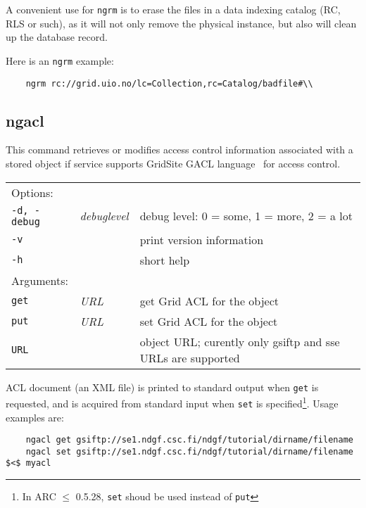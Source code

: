 \begin{framed}
   A convenient use for \texttt{ngrm} is to erase the files in a data
   indexing catalog (RC, RLS or such), as it will not only remove the
   physical instance, but also will clean up the database record.
\end{framed}

Here is an \texttt{ngrm} example:

\begin{verbatim}
    ngrm rc://grid.uio.no/lc=Collection,rc=Catalog/badfile#\\
\end{verbatim}

\subsection{ngacl}\label{sec:ngacl}

This command retrieves or modifies
access control information associated with a stored object if service
supports GridSite GACL language~\cite{gacl} for access control.
\hspace*{0.5cm}
\begin{shaded}
\end{shaded}
\begin{longtable}{llp{8cm}}
   Options:&&\\
    \texttt{-d, -debug} & \textit{debuglevel} &debug level: 0 = some, 1 = more, 2 = a lot \\
    \texttt{-v} && print version information\\
    \texttt{-h} && short help\\
   Arguments:&&\\
    \texttt{get} &\textit{URL}& get Grid ACL for the object\\
    \texttt{put} &\textit{URL}& set Grid ACL for the object\\
    \texttt{URL} && object URL; curently only gsiftp and sse URLs are supported\\
\end{longtable}

ACL document (an XML file) is printed to standard output when
\texttt{get} is requested, and is acquired from standard input when
\texttt{set} is specified\footnote{In ARC $\leq$ 0.5.28, \texttt{set}
  shoud be used instead of \texttt{put}}. Usage examples are:
\begin{verbatim}
    ngacl get gsiftp://se1.ndgf.csc.fi/ndgf/tutorial/dirname/filename
    ngacl set gsiftp://se1.ndgf.csc.fi/ndgf/tutorial/dirname/filename $<$ myacl
\end{verbatim}

